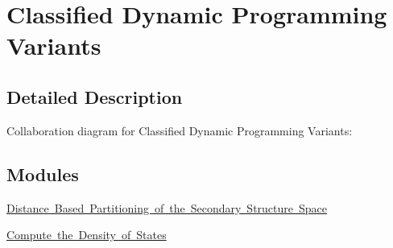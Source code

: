 \hypertarget{group__class__fold}{}\section{Classified Dynamic Programming Variants}
\label{group__class__fold}


\subsection{Detailed Description}
Collaboration diagram for Classified Dynamic Programming Variants\+:
\subsection*{Modules}
\begin{DoxyCompactItemize}
\item 
\mbox{\hyperlink{group__kl__neighborhood}{Distance Based Partitioning of the Secondary Structure Space}}
\item 
\mbox{\hyperlink{group__dos}{Compute the Density of States}}
\end{DoxyCompactItemize}
